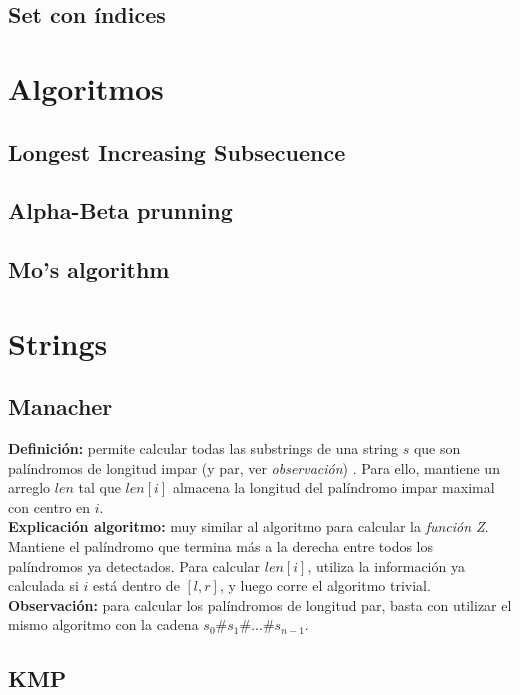 \subsection{Set con índices}


\section{Algoritmos}%
\subsection{Longest Increasing Subsecuence}
\subsection{Alpha-Beta prunning}
\subsection{Mo's algorithm}


\section{Strings}%
\subsection{Manacher}
\textbf{Definición: } permite calcular todas las substrings
de una string $s$ que son palíndromos de longitud impar (y par, ver 
\emph{observación}) . Para ello, mantiene un arreglo $len$ tal que $len[i]$ 
almacena la longitud del palíndromo impar maximal con centro en $i$. \\
\textbf{Explicación algoritmo: } muy similar al algoritmo para calcular
la \emph{función Z}. Mantiene el palíndromo que termina más a la derecha
entre todos los palíndromos ya detectados. Para calcular $len[i]$, utiliza
la información ya calculada si $i$ está dentro de $[l, r]$, y luego corre
el algoritmo trivial. \\
\textbf{Observación: } para calcular los palíndromos de longitud par, basta
con utilizar el mismo algoritmo con la cadena $s_0\#s_1\#...\#s_{n-1}$.
\subsection{KMP}
